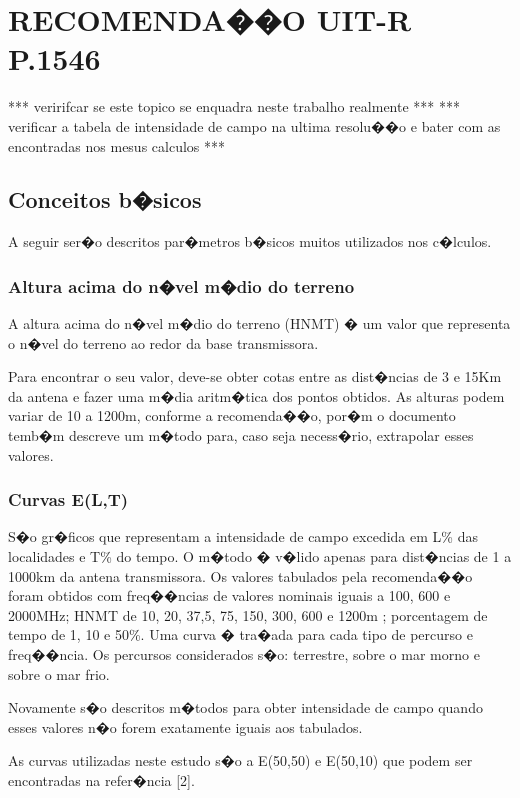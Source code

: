 \section{RECOMENDA��O UIT-R P.1546}

*** veririfcar se este topico se enquadra neste trabalho realmente ***
*** verificar a tabela de intensidade de campo na ultima resolu��o e bater com as encontradas nos mesus calculos ***


\subsection{Conceitos b�sicos}

A seguir ser�o descritos par�metros b�sicos muitos utilizados nos c�lculos.

\subsubsection{Altura acima do n�vel m�dio do terreno}

A altura acima do n�vel m�dio do terreno (HNMT) � um valor que representa o n�vel do terreno ao redor da base transmissora.

Para encontrar o seu valor, deve-se obter cotas entre as dist�ncias de 3 e 15Km da antena e fazer uma m�dia aritm�tica dos pontos obtidos.
As alturas podem variar de 10 a 1200m, conforme a recomenda��o, por�m o documento temb�m descreve um m�todo para, caso seja necess�rio, extrapolar 
esses valores.

\subsubsection{Curvas E(L,T)}

S�o gr�ficos que representam a intensidade de campo excedida em L\% das
localidades e T\% do tempo. O m�todo � v�lido apenas para dist�ncias de 1 a 1000km da
antena transmissora. Os valores tabulados pela recomenda��o foram obtidos com
freq��ncias de valores nominais iguais a 100, 600 e 2000MHz; HNMT de 10, 20, 37,5, 75,
150, 300, 600 e 1200m ; porcentagem de tempo de 1, 10 e 50\%. Uma curva � tra�ada para
cada tipo de percurso e freq��ncia. Os percursos considerados s�o: terrestre, sobre o mar
morno e sobre o mar frio.

Novamente s�o descritos m�todos para obter intensidade de campo quando esses
valores n�o forem exatamente iguais aos tabulados.

As curvas utilizadas neste estudo s�o a E(50,50) e E(50,10) que podem ser
encontradas na refer�ncia [2].

